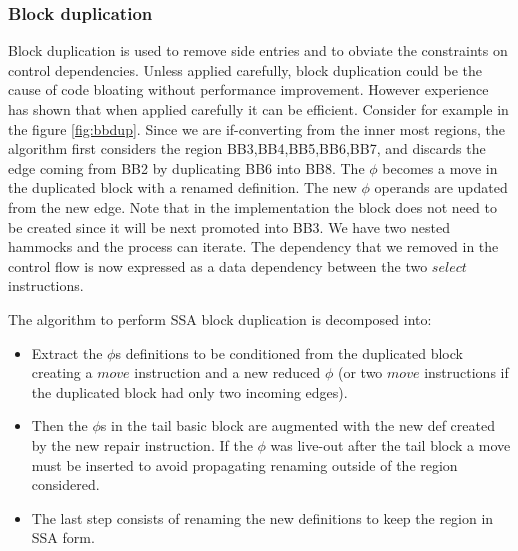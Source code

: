 \subsubsection{Block duplication}

Block duplication is used to remove side entries and to obviate the constraints on control dependencies. Unless applied carefully, block duplication could be the cause of code bloating without performance improvement. However experience has shown that when applied carefully it can be efficient.
Consider for example in the figure \ref{fig:bbdup}. Since we are if-converting from the inner most regions, the algorithm first considers the region {BB3,BB4,BB5,BB6,BB7}, and discards the edge coming from BB2 by duplicating BB6 into BB8. The $\phi$ becomes a move in the duplicated block with a renamed definition. The new $\phi$ operands are updated from the new edge. Note that in the implementation the block does not need to be created since it will be next promoted into BB3. We have two nested hammocks and the process can iterate. The dependency that we removed in the control flow is now expressed as a data dependency between the two $select$ instructions.

The algorithm to perform SSA block duplication is decomposed into:
\begin{itemize}
\item Extract the $\phi$s definitions to be conditioned from the duplicated block creating a $move$ instruction and a new reduced $\phi$ (or two $move$ instructions if the duplicated block had only two incoming edges).
\item Then the $\phi$s in the tail basic block are augmented with the new def created by the new repair instruction. If the $\phi$ was live-out after the tail block a move must be inserted to avoid propagating renaming outside of the region considered. 
\item The last step consists of renaming the new definitions to keep the region in SSA form.
\end{itemize}

